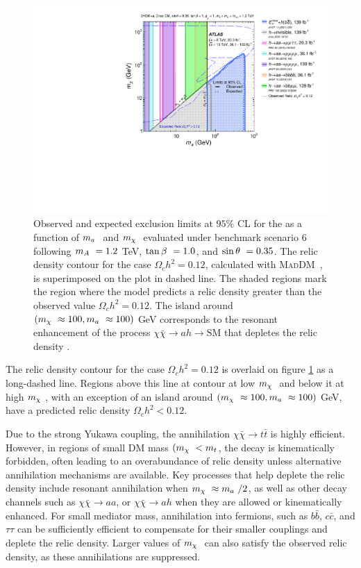 \begin{figure}[h!]
    \centering
    \includegraphics[width=0.6\linewidth]{figures/fig_09.pdf}
    \caption{Observed and expected exclusion limits at $95\%$ CL for the \thdma as a function of $m_a~$ and $m_{\chi}~$ evaluated under benchmark scenario 6 following $m_A~=1.2$ TeV, $\tan\beta~=1.0$, and $\sin\theta~=0.35$. The relic density contour for the case $\Omega_ch^2=0.12$, calculated with \textsc{MadDM}~\cite{Ambrogi:2018jqj}, is superimposed on the plot in dashed line. The shaded regions mark the region where the model predicts a relic density greater than the observed value $\Omega_ch^2=0.12$. The island around $(m_{\chi}~\approx100, m_a~\approx 100)$ GeV corresponds to the resonant enhancement of the process $\chi\bar{\chi} \rightarrow ah \rightarrow \mathrm{SM}$ that depletes the relic density \cite{2hdma_comb}. }
    \label{fig:result-ma-mX-scan}
\end{figure} 

The relic density contour for the case $\Omega_ch^2=0.12$ is overlaid on figure \ref{fig:result-ma-mX-scan} as a long-dashed line. Regions above this line at contour at low $m_{\chi}~$ and below it at high $m_{\chi}~$, with an exception of an island around $(m_{\chi}~\approx100, m_a~\approx 100)$ GeV, have a predicted relic density $\Omega_ch^2 < 0.12$. 

Due to the strong Yukawa coupling, the annihilation $\chi\bar{\chi}\rightarrow t\bar{t}$ is highly efficient. However, in regions of small DM mass $(m_{\chi}~ < m_t$, the decay is kinematically forbidden, often leading to an overabundance of relic density unless alternative annihilation mechanisms are available. Key processes that help deplete the relic density include resonant annihilation when $m_{\chi}~\approx m_a~/2$, as well as other decay channels such as $\chi\bar{\chi}\rightarrow aa$, or $\chi\bar{\chi}\rightarrow ah$ when they are allowed or kinematically enhanced. For small mediator mass, annihilation into fermions, such as $b\bar{b}$, $c\bar{c}$, and $\tau\tau$ can be sufficiently efficient to compensate for their smaller couplings and deplete the relic density. Larger values of $m_{\chi}~$ can also satisfy the observed relic density, as these annihilations are suppressed. 

